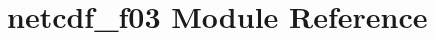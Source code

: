 \hypertarget{namespacenetcdf__f03}{}\section{netcdf\+\_\+f03 Module Reference}
\label{namespacenetcdf__f03}
